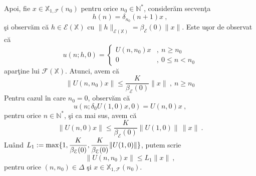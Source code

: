 \documentclass[ a4paper, 12pt]{report}
\newcommand{\E}{\mathcal{E}}
\newcommand{\F}{\mathcal{F}}
\newcommand{\N}{\mathbb{N}}
\newcommand{\X}{\mathbb{X}}
\theoremstyle{definition}
\theoremstyle{remark}
\numberwithin{equation}{section}
\begin{document}
Apoi, fie $x\in\X_{1,\F}(n_0)$ pentru orice $n_0\in\N^*$, consider\u am secven\c ta
\begin{equation}
h(n)=\delta_{n_0}(n+1)x \ ,
\end{equation}
\c si observ\u am c\u a $h\in\E(\X)$ cu $\|h\|_{\E(\X)}=\beta_{\E}(0)\|x\|$. Este u\c sor de observat c\u a
$$u(n;h,0) = \begin{cases}
U(n,n_0)x &,\ n\geq n_0\\
0 &,\ 0\leq n< n_0
\end{cases}
$$
apar\c tine lui $\F(\X)$. Atunci, avem c\u a
\begin{equation}
\|U(n,n_0)x\|\leq \frac{K}{\beta_{\E}(0)}\|x\|\ ,\ n\geq n_0
\end{equation}
Pentru cazul \^in care $n_0=0$, observ\u am c\u a
$$u(n;\delta_0 U(1,0)x,0)= U(n,0)x\ ,$$
pentru orice $n\in\N^*$, \c si ca mai sus, avem c\u a
\begin{equation}
\|U(n,0)x\|\leq \frac{K}{\beta_{\E}(0)}\|U(1,0)\|\,\|x\|\ .
\end{equation}
Lu\^and $L_1:=\max\{1, \ds\frac{K}{\beta_{\E}(0)}, \ds\frac{K}{\beta_{\E}(0)}\|U(1,0)\|\}$, putem scrie
$$\|U(n,n_0)x\|\leq L_1\|x\|\ ,$$
pentru orice $(n,n_0)\in\Delta$ \c si $x\in\X_{1,\F}(n_0)$.
\end{document}
